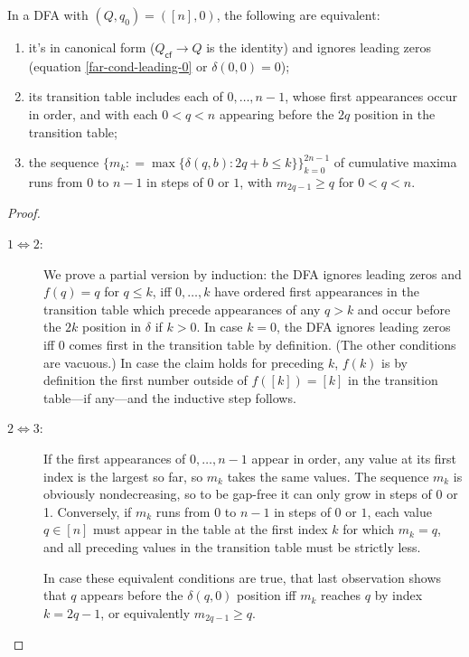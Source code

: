 \begin{lemma}
    \label{far-dfa-canonical form}
    In a DFA with $(Q,q_0)=([n],0)$, the following are equivalent:
    \begin{enumerate}
        \item it's in canonical form ($Q_\textsf{cf}\to Q$ is the identity)
              and ignores leading zeros (equation \eqref{far-cond-leading-0} or $\delta(0,0)=0$);
        \item its transition table includes each of $0,\ldots,n-1$, whose first appearances occur in order,
              and with each $0 < q < n$ appearing before the $2q$ position in the transition table;
        \item the sequence $\{m_k \mathrel{\mathop:}= \max\{\delta(q,b): 2q+b\le k\}\}_{k=0}^{2n-1}$ of cumulative maxima runs from $0$ to $n-1$ in steps of $0$ or $1$,
              with $m_{2q-1}\ge q$ for $0<q<n$.
    \end{enumerate}
\end{lemma}
\begin{proof}
    \begin{description}
        \item[$1\iff 2$:]
              We prove a partial version by induction:
              the DFA ignores leading zeros and $f(q)=q$ for $q\le k$,
              iff $0,\ldots,k$ have ordered first appearances in the transition table
              which precede appearances of any $q>k$
              and occur before the $2k$ position in $\delta$ if $k>0$.
              In case $k=0$, the DFA ignores leading zeros iff $0$ comes first in the transition table by definition.
              (The other conditions are vacuous.)
              In case the claim holds for preceding $k$, $f(k)$ is by definition the first number outside of $f([k])=[k]$ in the transition table---if any---and the inductive step follows.
        \item[$2\iff 3$:]
              If the first appearances of $0,\ldots,n-1$ appear in order, any value at its first index is the largest so far, so $m_k$ takes the same values. The sequence $m_k$ is obviously nondecreasing, so to be gap-free it can only grow in steps of 0 or 1.
              Conversely, if $m_k$ runs from $0$ to $n-1$ in steps of $0$ or $1$, each value $q\in [n]$ must appear in the table at the first index $k$ for which $m_k=q$, and all preceding values in the transition table must be strictly less.

              In case these equivalent conditions are true, that last observation shows that $q$ appears before the $\delta(q,0)$ position iff $m_k$ reaches $q$ by index $k=2q-1$, or equivalently $m_{2q-1}\ge q$.
    \end{description}
\end{proof}

